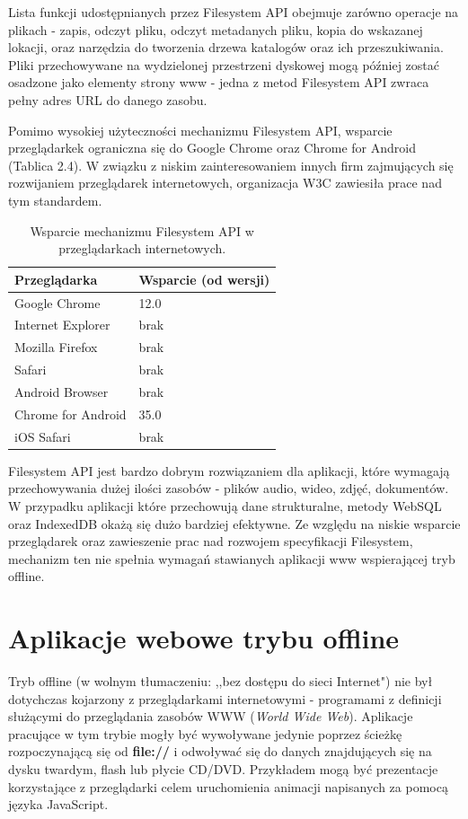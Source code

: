 Lista funkcji udostępnianych przez Filesystem API obejmuje zarówno operacje na plikach - zapis, odczyt pliku, odczyt metadanych pliku, kopia do wskazanej lokacji, oraz narzędzia do tworzenia drzewa katalogów oraz ich przeszukiwania. Pliki przechowywane na wydzielonej przestrzeni dyskowej mogą później zostać osadzone jako elementy strony www - jedna z metod Filesystem API zwraca pełny adres URL do danego zasobu.

Pomimo wysokiej użyteczności mechanizmu Filesystem API, wsparcie przeglądarkek ograniczna się do Google Chrome oraz Chrome for Android (Tablica 2.4). W związku z niskim zainteresowaniem innych firm zajmujących się rozwijaniem przeglądarek internetowych, organizacja W3C zawiesiła prace nad tym standardem.

\begin{table}[h]
\centering
    \begin{tabular}{ | p{8cm} | p{6cm} | }
    \hline
    \textbf{Przeglądarka} & \textbf{Wsparcie (od wersji)} \\ \hline
	Google Chrome & 12.0
	\\ \hline
	Internet Explorer & brak
	\\ \hline
	Mozilla Firefox & brak
	\\ \hline
	Safari & brak
	\\ \hline
	Android Browser & brak
	\\ \hline
	Chrome for Android & 35.0
	\\ \hline
	iOS Safari & brak
	\\ \hline
    \end{tabular}
	\caption{Wsparcie mechanizmu Filesystem API w przeglądarkach internetowych.}
\end{table}

Filesystem API jest bardzo dobrym rozwiązaniem dla aplikacji, które wymagają przechowywania dużej ilości zasobów - plików audio, wideo, zdjęć, dokumentów. W przypadku aplikacji które przechowują dane strukturalne, metody WebSQL oraz IndexedDB okażą się dużo bardziej efektywne. Ze względu na niskie wsparcie przeglądarek oraz zawieszenie prac nad rozwojem specyfikacji Filesystem, mechanizm ten nie spełnia wymagań stawianych aplikacji www wspierającej tryb offline.

\section{Aplikacje webowe trybu offline}
\label{sec:appWebOff}

Tryb offline\cite{whatOffline} (w wolnym tłumaczeniu: ,,bez dostępu do sieci Internet") nie był dotychczas kojarzony z przeglądarkami internetowymi - programami z definicji służącymi do przeglądania zasobów WWW (\emph{World Wide Web}). Aplikacje pracujące w tym trybie mogły być wywoływane jedynie poprzez ścieżkę rozpoczynającą się od \textbf{file://} i odwoływać się do danych znajdujących się na dysku twardym, flash lub płycie CD/DVD. Przykładem mogą być prezentacje korzystające z przeglądarki celem uruchomienia animacji napisanych za pomocą języka JavaScript.

